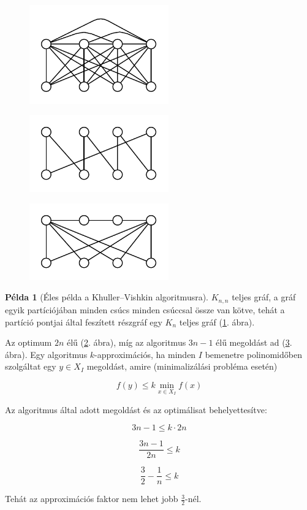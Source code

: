 \documentclass{article}
\theoremstyle{definition}
\newtheorem*{pelda}{Példa}
\begin{document}
\begin{figure}
\centering
\includegraphics[width=60mm,keepaspectratio]{figures/khuller_vishkin_eles_pelda.pdf}
\caption{}
\label{fig:khuller_vishkin_eles_pelda}
\end{figure}

\begin{figure}
\centering
\includegraphics[width=60mm,keepaspectratio]{figures/khuller_vishkin_eles_opt.pdf}
\caption{}
\label{fig:khuller_vishkin_eles_opt}
\end{figure}

\begin{figure}
\centering
\includegraphics[width=60mm,keepaspectratio]{figures/khuller_vishkin_eles_alg.pdf}
\caption{}
\label{fig:khuller_vishkin_eles_alg}
\end{figure}

\begin{pelda}[Éles példa a Khuller--Vishkin algoritmusra]
$K_{n,n}$ teljes gráf, a gráf egyik partíciójában minden csúcs minden csúccsal össze van kötve, tehát a partíció pontjai által feszített részgráf egy $K_n$ teljes gráf (\ref{fig:khuller_vishkin_eles_pelda}. ábra).

Az optimum $2n$ élű (\ref{fig:khuller_vishkin_eles_opt}. ábra), míg az algoritmus $3n-1$ élű megoldást ad (\ref{fig:khuller_vishkin_eles_alg}. ábra). Egy algoritmus $k$-approximációs, ha minden $I$ bemenetre polinomidőben szolgáltat egy $y \in X_I$ megoldást, amire (minimalizálási probléma esetén) 

\[ f(y) \leq k \min_{x \in X_I} f(x) \]

Az algoritmus által adott megoldást és az optimálisat behelyettesítve:

\[ 3n-1 \leq k \cdot 2n \]

\[ \frac{3n-1}{2n} \leq k \]

\[ \frac{3}{2}-\frac{1}{n} \leq k \]

Tehát az approximációs faktor nem lehet jobb $\frac{3}{2}$-nél.
\end{pelda}
\end{document}

